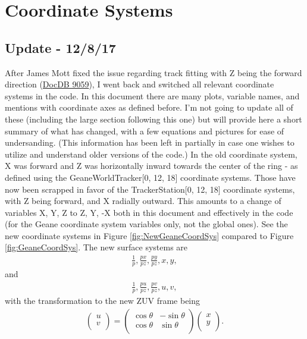 \section{Coordinate Systems}
\label{sec:Coord}

\subsection{Update - 12/8/17}

	After James Mott fixed the issue regarding track fitting with Z being the forward direction (\href{https://gm2-docdb.fnal.gov/cgi-bin/private/ShowDocument?docid=9059}{DocDB 9059}), I went back and switched all relevant coordinate systems in the code. In this document there are many plots, variable names, and mentions with coordinate axes as defined before. I'm not going to update all of these (including the large section following this one) but will provide here a short summary of what has changed, with a few equations and pictures for ease of undersanding. (This information has been left in partially in case one wishes to utilize and understand older versions of the code.) In the old coordinate system, X was forward and Z was horizontally inward towards the center of the ring - as defined using the GeaneWorldTracker[0, 12, 18] coordinate systems. Those have now been scrapped in favor of the TrackerStation[0, 12, 18] coordinate systems, with Z being forward, and X radially outward. This amounts to a change of variables {X, Y, Z} to {Z, Y, -X} both in this document and effectively in the code (for the Geane coordinate system variables only, not the global ones). See the new coordinate systems in Figure \ref{fig:NewGeaneCoordSys} compared to Figure \ref{fig:GeaneCoordSys}. The new surface systems are 
 		\begin{align}
			\frac{1}{p}, \frac{px}{pz}, \frac{py}{pz}, x, y,
		\end{align}
	and
	 	\begin{align}
			\frac{1}{p}, \frac{pu}{pz}, \frac{pv}{pz}, u, v,			
		\end{align}
	with the transformation to the new ZUV frame being 
		\begin{align}
			\begin{pmatrix}
				u \\
				v \\
			\end{pmatrix} =
			\begin{pmatrix}
				\cos{\theta} & -\sin{\theta} \\
				\cos{\theta} & \sin{\theta} \\
			\end{pmatrix}
			\begin{pmatrix}
				x \\
				y \\
			\end{pmatrix}.
		\end{align}

